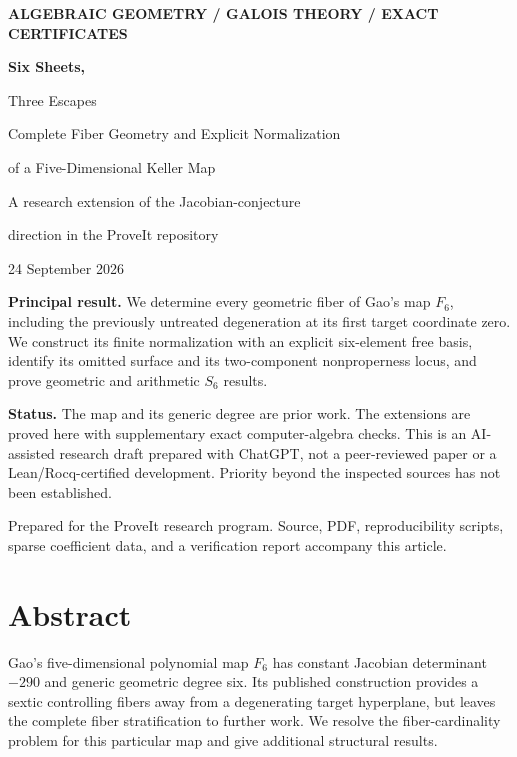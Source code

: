 \documentclass[11pt,a4paper]{article}
\theoremstyle{definition}
\begin{document}
\hypersetup{pageanchor=false}
\begin{titlepage}
\color{Ink}
\vspace*{12mm}
{\small\sffamily\bfseries\color{Accent} ALGEBRAIC GEOMETRY \; / \; GALOIS THEORY \; / \; EXACT CERTIFICATES\par}
\vspace{17mm}
{\Huge\bfseries Six Sheets,\par Three Escapes\par}
\vspace{8mm}
{\LARGE Complete Fiber Geometry and Explicit Normalization\par}
\vspace{3mm}
{\Large of a Five-Dimensional Keller Map\par}
\vspace{14mm}
{\large A research extension of the Jacobian-conjecture\par direction in the ProveIt repository\par}
\vspace{7mm}
{24 September 2026\par}
\vfill
\begin{claimbox}
\textbf{Principal result.} We determine every geometric fiber of Gao's map
$F_6$, including the previously untreated degeneration at its first target
coordinate zero. We construct its finite normalization with an explicit
six-element free basis, identify its omitted surface and its two-component
nonproperness locus, and prove geometric and arithmetic $S_6$ results.

\textbf{Status.} The map and its generic degree are prior work. The extensions
are proved here with supplementary exact computer-algebra checks. This is an
AI-assisted research draft prepared with ChatGPT, not a peer-reviewed paper
or a Lean/Rocq-certified development. Priority beyond the inspected sources
has not been established.
\end{claimbox}
\vspace{6mm}
{\small Prepared for the ProveIt research program. Source, PDF, reproducibility
scripts, sparse coefficient data, and a verification report accompany this article.\par}
\end{titlepage}
\hypersetup{pageanchor=true}

\section*{Abstract}
Gao's five-dimensional polynomial map $F_6$ has constant Jacobian determinant
$-290$ and generic geometric degree six. Its published construction provides
a sextic controlling fibers away from a degenerating target hyperplane,
but leaves the complete fiber stratification to further work. We resolve
the fiber-cardinality problem for this particular map and give additional
structural results.
\end{document}
